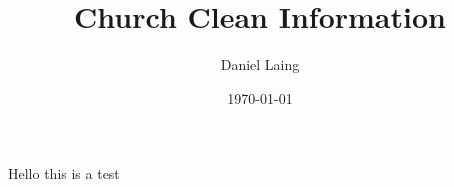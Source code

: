 \documentclass[a4paper, 12pt, final, oneside]{article}
\title{Church Clean Information}
\author{Daniel Laing}
\date{\today}
\begin{document}
\maketitle

\clearpage

Hello this is a test
\end{document}
